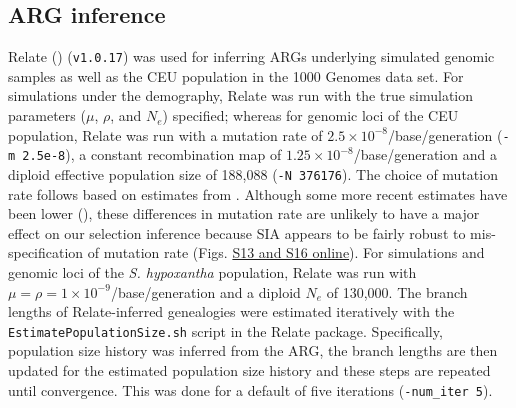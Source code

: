 \subsection{\ac{ARG} inference}
Relate (\cite{speidel_method_2019}) (\texttt{v1.0.17}) was used for inferring \acp{ARG} underlying simulated genomic samples as well as the CEU population in the 1000 Genomes data set. For simulations under the \cite{tennessen_evolution_2012} demography, Relate was run with the true simulation parameters ($\mu$, $\rho$, and $N_e$) specified; whereas for genomic loci of the CEU population, Relate was run with a mutation rate of $2.5 \times 10^{-8}$/base/generation (\texttt{-m 2.5e-8}), a constant recombination map of $1.25 \times 10^{-8}$/base/generation and a diploid effective population size of 188,088 (\texttt{-N 376176}). The choice of mutation rate follows \cite{stern_approximate_2019} based on estimates from \cite{nachman_estimate_2000}. Although some more recent estimates have been lower (\cite{scally_revising_2012}), these differences in mutation rate are unlikely to have a major effect on our selection inference because \ac{SIA} appears to be fairly robust to mis-specification of mutation rate (Figs. \href{https://academic.oup.com/mbe/article/39/1/msab332/6433161?login=true#supplementary-data}{S13 and S16 online}). For simulations and genomic loci of the \textit{S. hypoxantha} population, Relate was run with $\mu = \rho = 1 \times 10^{-9}$/base/generation and a diploid $N_e$ of 130,000. The branch lengths of Relate-inferred genealogies were estimated iteratively with the \texttt{EstimatePopulationSize.sh} script in the Relate package. Specifically, population size history was inferred from the \ac{ARG}, the branch lengths are then updated for the estimated population size history and these steps are repeated until convergence. This was done for a default of five iterations (\texttt{-num\_iter 5}).

